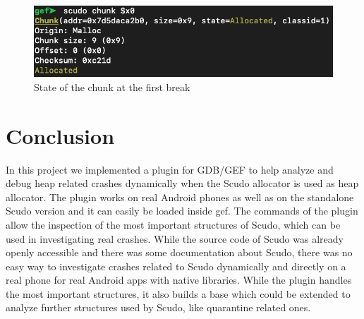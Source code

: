 \documentclass[a4paper,11pt,oneside]{report}
\begin{document}
\begin{figure}[h!]
  \centering
  \includegraphics[width=\linewidth]{figures/ScudoV3MobilePlusChunkBefore.png}
  \caption{State of the chunk at the first break}
  \label{fig:ScudoV3MobilePlusChunkBefore}
\end{figure}


\chapter{Conclusion}

In this project we implemented a plugin for GDB/GEF to help analyze and debug
heap related crashes dynamically when the Scudo allocator is used as heap allocator.
The plugin works on real Android phones as well as on the standalone Scudo
version and it can easily be loaded inside gef. The commands of the plugin
allow the inspection of the most important structures of Scudo, which can
be used in investigating real crashes. While the source code of Scudo was
already openly accessible and there was some documentation about Scudo, there
was no easy way to investigate crashes related to Scudo dynamically and directly
on a real phone for real Android apps with native libraries. While the plugin
handles the most important structures, it also builds a base which could be
extended to analyze further structures used by Scudo, like quarantine related ones.

\cleardoublepage{}
\printbibliography{}

%
%
\end{document}

